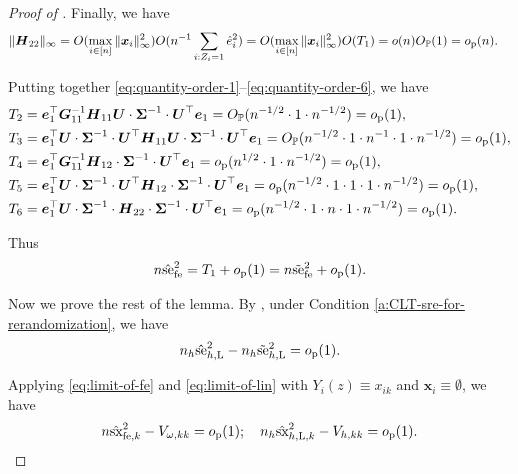\documentclass[12pt]{article}
\newcommand{\se}{\textnormal{se}}
\newcommand{\Lin}{\textnormal{L}}
\newcommand{\op}{o_{\textnormal{p}}}
\newcommand{\Op}{O_{\mathbb{P}}}
\newcommand{\fe}{\textnormal{fe}}
\newcommand{\bs}{\boldsymbol}
\newcommand{\sx}{\textnormal{sx}}
\begin{document}
\begin{proof}[Proof of ]
Finally, we have
\begin{align}
\label{eq:quantity-order-6}
    \|\bs{H}_{22}\|_{\infty} &= O(\max_{i\in [n]}\|\bs{x}_i\|_{\infty}^2)O(n^{-1}\sum_{i:Z_i=1}\hat{e}_i^2) =  O(\max_{i\in [n]}\|\bs{x}_i\|_{\infty}^2)O(T_1)
    = o(n)\Op(1) = \op(n).
\end{align}

Putting together \eqref{eq:quantity-order-1}--\eqref{eq:quantity-order-6}, we have
\begin{align*}
    T_2& = \bs{e}_1^\top  \bs{G}_{11}^{-1} \bs{H}_{11}  \bs{U}\cdot\bs{\Sigma}^{-1} \cdot \bs{U}^\top \bs{e}_1 = \Op(n^{-1/2}\cdot 1 \cdot n^{-1/2}) = \op(1),\\
    T_3 &= \bs{e}_1^\top  \bs{U}\cdot\bs{\Sigma}^{-1}\cdot\bs{U}^\top \bs{H}_{11}  \bs{U}\cdot\bs{\Sigma}^{-1}\cdot\bs{U}^\top \bs{e}_1 = \Op(n^{-1/2}\cdot 1 \cdot n^{-1} \cdot 1 \cdot n^{-1/2}) = \op(1),\\
    T_4& =\bs{e}_1^\top  \bs{G}_{11}^{-1} \bs{H}_{12} \cdot \bs{\Sigma}^{-1}\cdot\bs{U}^\top \bs{e}_1 = \op(n^{1/2} \cdot 1 \cdot n^{-1/2}) = \op(1),\\
    T_5 &= \bs{e}_1^\top  \bs{U}\cdot\bs{\Sigma}^{-1}\cdot\bs{U}^\top \bs{H}_{12} \cdot \bs{\Sigma}^{-1} \cdot \bs{U}^\top  \bs{e}_1 = \op(n^{-1/2}\cdot 1 \cdot 1 \cdot 1 \cdot n^{-1/2}) = \op(1),\\
    T_6 &= \bs{e}_1^\top  \bs{U}\cdot\bs{\Sigma}^{-1}\cdot \bs{H}_{22} \cdot \bs{\Sigma}^{-1} \cdot \bs{U}^\top  \bs{e}_1 = \op(n^{-1/2} \cdot 1 \cdot n \cdot 1 \cdot n^{-1/2}) = \op(1).
\end{align*}

Thus 
\begin{align}
\label{eq:limit-of-fe}
    n\hat{\se}_{\fe }^2 = T_1 + \op(1) = n\tilde{\se}_{\fe }^2 + \op(1).
\end{align}

Now we prove the rest of the lemma. By \cite[][Theorem 8]{2020Rerandomization}, under Condition \ref{a:CLT-sre-for-rerandomization}, we have
\begin{align}
\label{eq:limit-of-lin}
     n_h\hat{\se}^2_{h,\Lin} - n_h\tilde{\se}^2_{h,\Lin} = \op(1).
\end{align}

Applying \eqref{eq:limit-of-fe} and \eqref{eq:limit-of-lin} with $Y_i(z) \equiv x_{ik}$ and $\bs{x}_i\equiv \emptyset$, we have
\[
n \hat{\sx}_{\fe ,k}^2 - V_{\omega,kk} = \op(1); \quad n_h \hat{\sx}_{h,\Lin,k}^2- V_{h,kk} = \op(1).
\]
\end{proof}
\end{document}
